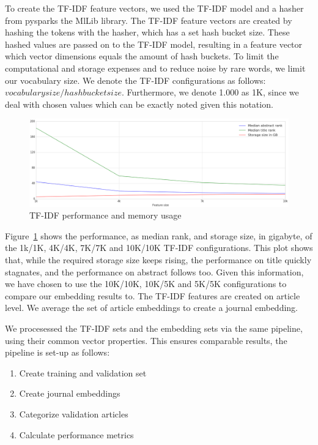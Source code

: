 \documentclass[../../Thesis.tex]{subfiles}
\begin{document}
To create the TF-IDF feature vectors, we used the TF-IDF model and a hasher from pysparks the MlLib library. The TF-IDF feature vectors are created by hashing the tokens with the hasher, which has a set hash bucket size. These hashed values are passed on to the TF-IDF model, resulting in a feature vector which vector dimensions equals the amount of hash buckets. To limit the computational and storage expenses and to reduce noise by rare words, we limit our vocabulary size.
We denote the TF-IDF configurations as follows: $vocabulary size/hashbucket size$. Furthermore, we denote 1.000 as 1K, since we deal with chosen values which can be exactly noted given this notation.
\begin{figure}
\includegraphics[width=6in]{Plots/tfidf_selection_plot}
\caption{TF-IDF performance and memory usage}\label{figure:tfidfPerformance}
\end{figure}
\FloatBarrier
Figure~\ref{figure:tfidfPerformance} shows the performance, as median rank, and storage size, in gigabyte, of the 1k/1K, 4K/4K, 7K/7K and 10K/10K TF-IDF configurations. This plot shows that, while the required storage size keeps rising, the performance on title quickly stagnates, and the performance on abstract follows too. Given this information, we have chosen to use the 10K/10K, 10K/5K and 5K/5K configurations to compare our embedding results to. The TF-IDF features are created on article level. We average the set of article embeddings to create a journal embedding. 

We procesessed the TF-IDF sets and the embedding sets via the same pipeline, using their common vector properties. This ensures comparable results, the pipeline is set-up as follows:
\begin{enumerate}
\item{Create training and validation set}
\item{Create journal embeddings}
\item{Categorize validation articles}
\item{Calculate performance metrics}
\end{enumerate}
  
\end{document}
